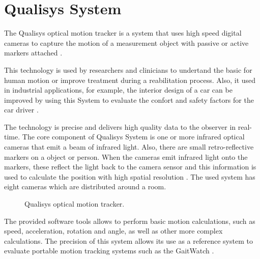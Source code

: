 \section{Qualisys System}
The Qualisys optical motion tracker is a system that uses high speed digital cameras to capture the motion of a measurement object with passive or active markers attached \cite{OlivaresBotzel2013}.

This technology is used by researchers and clinicians to undertand the basic for human motion or improve treatment during a reabilitation process. Also, it used in industrial applications, for example, the interior design of a car can be improved by using this System to evaluate the confort and safety factors for the car driver \cite{Qualisys}.

The technology is precise and delivers high quality data to the observer in real-time. The core component of Qualisys System is one or more infrared optical cameras that emit a beam of infrared light. Also, there are small retro-reflective markers on a object or person. When the cameras emit infrared light onto the markers, these reflect the light back to the camera sensor and this information is used to calculate the position with high spatial resolution  \cite{Qualisys}. The used system has eight cameras which are distributed around a room.

\begin{figure}[H]
	\centering
	\caption{Qualisys optical motion tracker.}
	\label{fig:QS}
\end{figure}

The provided software tools allows to perform basic motion calculations,
such as speed, acceleration, rotation and angle, as well as other more complex
calculations. The precision of this system allows its use as a reference system to evaluate portable motion tracking systems such as the GaitWatch  \cite{OlivaresBotzel2013}.
